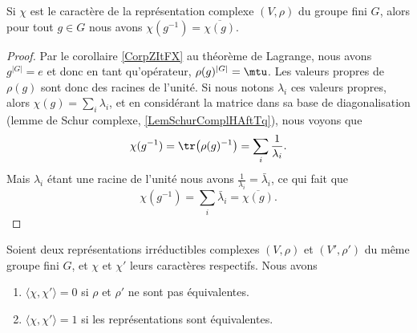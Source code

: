 \begin{lemma}   \label{LemJqIZns}
    Si \( \chi\) est le caractère de la représentation complexe \( (V,\rho)\) du groupe fini \( G\), alors pour tout \( g\in G\) nous avons \( \chi(g^{-1})=\overline{ \chi(g) }\).
\end{lemma}

\begin{proof}
    Par le corollaire \ref{CorpZItFX} au théorème de Lagrange, nous avons \( g^{| G |}=e\) et donc en tant qu'opérateur, \( \rho(g)^{| G |}=\mtu\). Les valeurs propres de \( \rho(g)\) sont donc des racines de l'unité. Si nous notons \( \lambda_i\) ces valeurs propres, alors \( \chi(g)=\sum_i\lambda_i\), et en considérant la matrice dans sa base de diagonalisation (lemme de Schur complexe, \ref{LemSchurComplHAftTq}), nous voyons que
    \begin{equation}
        \chi(g^{-1})=\tr\big( \rho(g)^{-1} \big)=\sum_i\frac{1}{ \lambda_i }.
    \end{equation}
    Mais \( \lambda_i\) étant une racine de l'unité nous avons \( \frac{1}{ \lambda_i }=\bar\lambda_i\), ce qui fait que
    \begin{equation}
        \chi(g^{-1})=\sum_i\bar\lambda_i=\overline{ \chi(g) }.
    \end{equation}
\end{proof}

\begin{proposition} \label{PropJzbfWi}
    Soient deux représentations irréductibles complexes \( (V,\rho)\) et \( (V',\rho')\) du même groupe fini \( G\), et \( \chi\) et \( \chi'\) leurs caractères respectifs. Nous avons
    \begin{enumerate}
        \item
            \( \langle \chi, \chi'\rangle =0\) si \( \rho\) et \( \rho'\) ne sont pas équivalentes.
        \item
            \( \langle \chi, \chi'\rangle =1\) si les représentations sont équivalentes.
    \end{enumerate}
\end{proposition}

